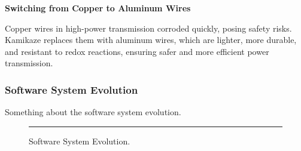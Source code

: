 \vspace{0.2cm}
\textbf{Switching from Copper to Aluminum Wires}

Copper wires in high-power transmission corroded quickly, posing safety risks. Kamikaze replaces them with aluminum wires, which are lighter, more durable, and resistant to redox reactions, ensuring safer and more efficient power transmission.

\subsubsection{Software System Evolution}

Something about the software system evolution. \lipsum[1]

\begin{figure}[h]
    \centering
    \rule{0.8\columnwidth}{4cm}
    \caption{Software System Evolution.}
    \label{fig:software_system}
\end{figure}